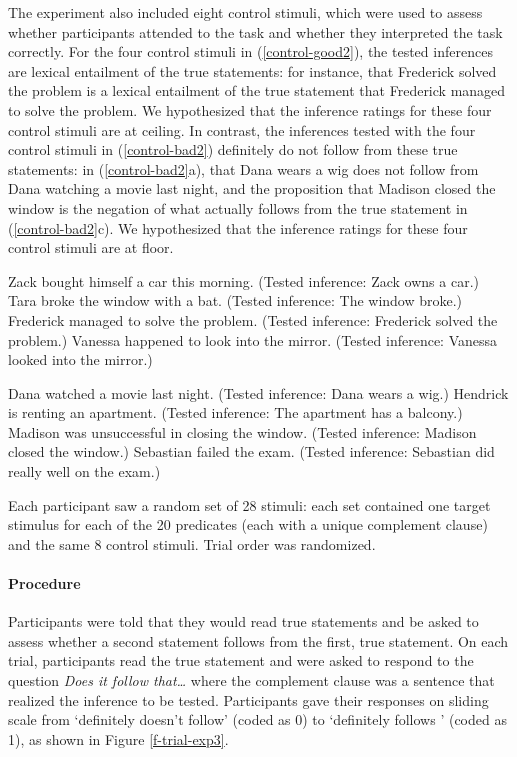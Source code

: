 \documentclass[11pt,fleqn]{article}
\newcommand{\6}{\mbox{$[\hspace*{-.6mm}[$}}
\newcommand{\9}{\mbox{$]\hspace*{-.6mm}]$}}
\begin{document}
The experiment also included eight control stimuli, which were used to assess whether participants attended to the task and whether they interpreted the task correctly. For the four control stimuli in (\ref{control-good2}), the tested inferences are lexical entailment of the true statements: for instance, that Frederick solved the problem is a lexical entailment of the true statement that Frederick managed to solve the problem. We hypothesized that the inference ratings for these four control stimuli are at ceiling. In contrast, the inferences tested with the four control stimuli in (\ref{control-bad2}) definitely do not follow from these true statements: in (\ref{control-bad2}a), that Dana wears a wig does not follow from Dana watching a movie last night, and the proposition that Madison closed the window is the negation of what actually follows from the true statement in (\ref{control-bad2}c). We hypothesized that the inference ratings for these four control stimuli are at floor.

\begin{exe}
\ex\label{control-good2}
\begin{xlist}
 Zack bought himself a car this morning. (Tested inference: Zack owns a car.)
 Tara broke the window with a bat. (Tested inference: The window broke.)
 Frederick managed to solve the problem. (Tested inference: Frederick solved the problem.)
 Vanessa happened to look into the mirror. (Tested inference: Vanessa looked into the mirror.)
\end{xlist}
\ex\label{control-bad2}
\begin{xlist}
 Dana watched a movie last night. (Tested inference: Dana wears a wig.)
 Hendrick is renting an apartment. (Tested inference: The apartment has a balcony.)
 Madison was unsuccessful in closing the window. (Tested inference:  Madison closed the window.)
 Sebastian failed the exam. (Tested inference: Sebastian did really well on the exam.)
\end{xlist}
\end{exe}

Each participant saw a random set of 28 stimuli: each set contained one target stimulus for each of the 20 predicates (each with a unique complement clause) and the same 8 control stimuli. Trial order was randomized.

\paragraph{Procedure} Participants were told that they would read true statements and be asked to assess whether a second statement follows from the first, true statement. On each trial, participants read the true statement and were asked to respond to the question {\em Does it follow that\ldots} where the complement clause was a sentence that realized the inference to be tested.  Participants gave their responses on sliding scale from `definitely doesn't follow' (coded as 0) to `definitely follows ' (coded as 1), as shown in Figure \ref{f-trial-exp3}.
\end{document}
